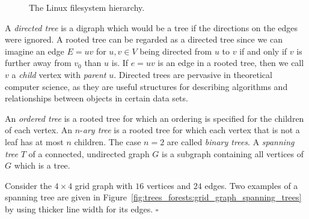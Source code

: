 \begin{figure}[!htbp]
\centering
{}
\caption{The Linux filesystem hierarchy.}
\label{fig:trees_forests:filesystem_hierarchy}
\end{figure}

A \emph{directed tree} is a digraph which would
be a tree if the directions on the edges were ignored. A rooted tree
can be regarded as a directed tree since we can imagine an edge
$E = uv$ for $u,v \in V$ being directed from $u$ to $v$ if and only
if $v$ is further away from $v_0$ than $u$ is. If $e = uv$ is an edge
in a rooted tree, then we call $v$ a \emph{child} vertex
with \emph{parent} $u$. Directed trees are pervasive in
theoretical computer science, as they are useful structures for
describing algorithms and relationships between objects in certain
data sets.

An \emph{ordered tree} is a rooted tree for which
an ordering is specified for the children of each vertex. An
$n$-\emph{ary tree} is a rooted tree for which
each vertex that is not a leaf has at most $n$ children. The case
$n = 2$ are called \emph{binary trees}. A
\emph{spanning tree} $T$ of a connected,
undirected graph $G$ is a subgraph containing all vertices of $G$
which is a tree.

\begin{example}
\label{eg:trees_forests:spanning_tree}
{\rm
Consider the $4 \times 4$ grid graph with $16$ vertices and
$24$ edges. Two examples of a spanning tree are given in
Figure~\ref{fig:trees_forests:grid_graph_spanning_trees} by using
thicker line width for its edges.}
\hfill $\square$
\end{example}

